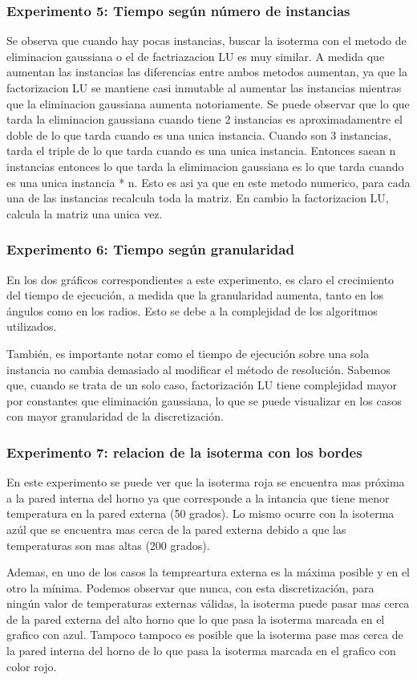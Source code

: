{\subsubsection*{Experimento 5: Tiempo según número de instancias}
	Se observa que cuando hay pocas instancias, buscar la isoterma con el metodo de eliminacion gaussiana o el de factriazacion LU es muy similar. A medida que aumentan las instancias las diferencias entre ambos metodos aumentan, ya que la factorizacion LU se mantiene casi inmutable al aumentar las instancias mientras que la eliminacion gaussiana aumenta notoriamente. Se puede observar que lo que tarda la eliminacion gaussiana cuando tiene 2 instancias es aproximadamentre el doble de lo que tarda cuando es una unica instancia. Cuando son 3 instancias, tarda el triple de lo que tarda cuando es una unica instancia. Entonces saean n instancias entonces lo que tarda la elimimacion gaussiana es lo que tarda cuando es una unica instancia * n. Esto es asi ya que en este metodo numerico, para cada una de las instancias recalcula toda la matriz. En cambio la factorizacion LU, calcula la matriz una unica vez.


\subsubsection*{Experimento 6: Tiempo según granularidad}
  	En los dos gráficos correspondientes a este experimento, es claro el crecimiento del tiempo de ejecución, a medida que la granularidad aumenta, tanto en los ángulos como en los radios. Esto se debe a la complejidad de los algoritmos utilizados.

  	También, es importante notar como el tiempo de ejecución sobre una sola instancia no cambia demasiado al modificar el método de resolución. Sabemos que, cuando se trata de un solo caso, factorización LU tiene complejidad mayor por constantes que eliminación gaussiana, lo que se puede visualizar en los casos con mayor granularidad de la discretización.


\subsubsection*{Experimento 7: relacion de la isoterma con los bordes}
 	En este experimento se puede ver que la isoterma roja se encuentra mas próxima a la pared interna del horno ya que corresponde a la intancia que tiene menor temperatura en la pared externa (50 grados). Lo mismo ocurre con la isoterma azúl que se encuentra mas cerca de la pared externa debido a que las temperaturas son mas altas (200 grados).

 	Ademas, en uno de los casos la tempreartura externa es la máxima posible y en el otro la mínima. Podemos observar que nunca, con esta discretización, para ningún valor de temperaturas externas válidas, la isoterma puede pasar mas cerca de la pared externa del alto horno que lo que pasa la isoterma marcada en el grafico con azul. Tampoco tampoco es posible que la isoterma pase mas cerca de la pared interna del horno de lo que pasa la isoterma marcada en el grafico con color rojo.
}
